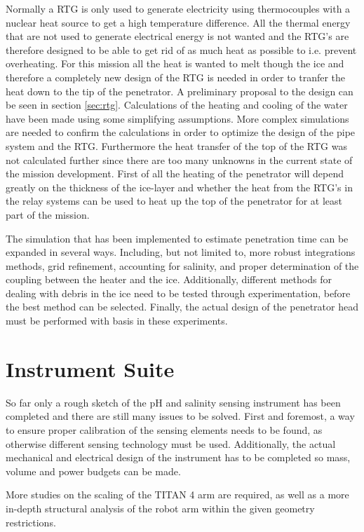 Normally a RTG is only used to generate electricity using thermocouples with a nuclear heat source to get a high temperature difference. All the thermal energy that are not used to generate electrical energy is not wanted and the RTG's are therefore designed to be able to get rid of as much heat as possible to i.e. prevent overheating. For this mission all the heat is wanted to melt though the ice and therefore a completely new design of the RTG is needed in order to tranfer the heat down to the tip of the penetrator. A preliminary proposal to the design can be seen in section \ref{sec:rtg}. Calculations of the heating and cooling of the water have been made using some simplifying assumptions. More complex simulations are needed to confirm the calculations in order to optimize the design of the pipe system and the RTG. Furthermore the heat transfer of the top of the RTG was not calculated further since there are too many unknowns in the current state of the mission development. First of all the heating of the penetrator will depend greatly on the thickness of the ice-layer and whether the heat from the RTG's in the relay systems can be used to heat up the top of the penetrator for at least part of the mission.

The simulation that has been implemented to estimate penetration time can be expanded in several ways. Including, but not limited to, more robust integrations methods, grid refinement, accounting for salinity, and proper determination of the coupling between the heater and the ice. Additionally, different methods for dealing with debris in the ice need to be tested through experimentation, before the best method can be selected. Finally, the actual design of the penetrator head must be performed with basis in these experiments.

\section{Instrument Suite}
	
So far only a rough sketch of the pH and salinity sensing instrument has been completed and there are still many issues to be solved. First and foremost, a way to ensure proper calibration of the sensing elements needs to be found, as otherwise different sensing technology must be used. Additionally, the actual mechanical and electrical design of the instrument has to be completed so mass, volume and power budgets can be made.

More studies on the scaling of the TITAN 4 arm are required, as well as a more in-depth structural analysis of the robot arm within the given geometry restrictions.


